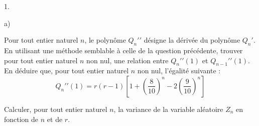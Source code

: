 \documentclass[11pt]{article}%
\begin{document}
\begin{noliste}{1.}
\item 

\begin{noliste}{a)}
 \setlength{\itemsep}{2mm}
\item Pour tout entier naturel $n$, le polynôme $Q_{n}{\prime \prime }$
désigne la dérivée du polynôme $Q_{n}{\prime }$.\\
En utilisant une méthode semblable à celle de la question précédente,
trouver pour tout entier naturel $n$ non nul, une relation entre
$Q_{n}{\prime \prime }(1)$ et $Q_{n-1}{\prime \prime }(1)$.\\
En déduire que, pour tout entier naturel $n$ non nul, l'égalité
suivante : 
\[
Q_{n}{\prime \prime }(1) = r(r-1)\left[ 1 + \left( \frac{8}{10}\right)
^{n}-2\left( \frac{9}{10}\right) ^{n}\right]
\]

\item Calculer, pour tout entier naturel $n$, la variance de la
variable aléatoire $Z_{n}$ en fonction de $n$ et de $r$.
\end{noliste}
\end{noliste}

\label{fin}
\end{document}
